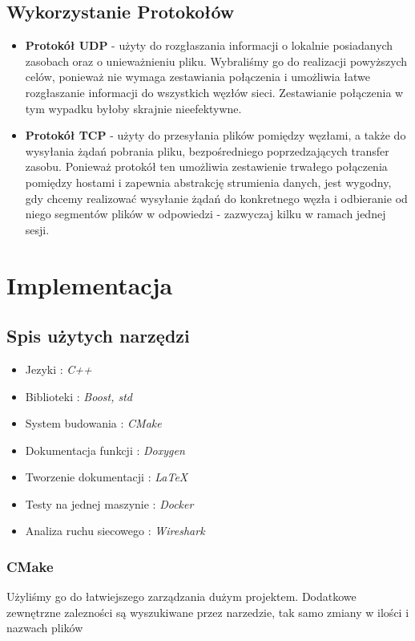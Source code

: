 \documentclass[11pt,oneside]{book}
\newcommand{\+}{\discretionary{\mbox{\scriptsize$\hookleftarrow$}}{}{}}
\begin{document}
\section{Wykorzystanie Protokołów}
\begin{itemize}
\item{\textbf{Protokół UDP}} - użyty do rozgłaszania informacji o lokalnie posiadanych zasobach oraz o unieważnieniu pliku. Wybraliśmy go do realizacji powyższych celów, ponieważ nie wymaga zestawiania połączenia i umożliwia łatwe rozgłaszanie informacji do wszystkich węzłów sieci.  Zestawianie połączenia w tym wypadku byłoby skrajnie nieefektywne. 
\item{\textbf{Protokół TCP}} - użyty do przesyłania plików pomiędzy węzłami, a także do wysyłania żądań pobrania pliku, bezpośredniego poprzedzających transfer zasobu. Ponieważ protokół ten umożliwia zestawienie trwałego połączenia pomiędzy hostami i zapewnia abstrakcję strumienia danych, jest wygodny, gdy chcemy realizować wysyłanie żądań do konkretnego węzła i odbieranie od niego segmentów plików w odpowiedzi - zazwyczaj kilku w ramach jednej sesji.
\end{itemize}
\chapter{Implementacja}
\section{Spis użytych narzędzi}
\begin{itemize}
\item
Jezyki : \textit{C++}
\item
Biblioteki : \textit{Boost, std}
\item 
System budowania : \textit{CMake}
\item
Dokumentacja funkcji : \textit{Doxygen}
\item
Tworzenie dokumentacji : \textit{LaTeX}
\item 
Testy na jednej maszynie : \textit{Docker}
\item 
Analiza ruchu siecowego : \textit{Wireshark}
\end{itemize}
\subsection{CMake}
Użyliśmy go do łatwiejszego zarządzania dużym projektem. Dodatkowe zewnętrzne zalezności są wyszukiwane przez narzedzie, tak samo zmiany w ilości i nazwach plików
\end{document}
